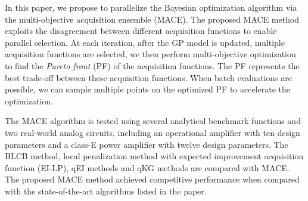 In this paper, we propose to parallelize the Bayesian optimization algorithm
via the multi-objective acquisition ensemble (MACE). The proposed MACE method
exploits the disagreement between different acquisition functions to enable
parallel selection. At each iteration, after the GP model is updated, multiple
acquisition functions are selected, we then perform multi-objective
optimization to find the \emph{Pareto front} (PF) of the acquisition functions.
The PF represents the best trade-off between these acquisition functions. When
batch evaluations are possible, we can sample multiple points on the optimized
PF to accelerate the optimization.

The MACE algorithm is tested using several analytical benchmark functions and
two real-world analog circuits, including an operational amplifier with ten
design parameters and a class-E power amplifier with twelve design parameters.
The BLCB method, local penalization method with expected improvement
acquisition function (EI-LP), qEI methods and qKG methods are compared with
MACE. The proposed MACE method achieved competitive performance when compared
with the state-of-the-art algorithms listed in the paper.
